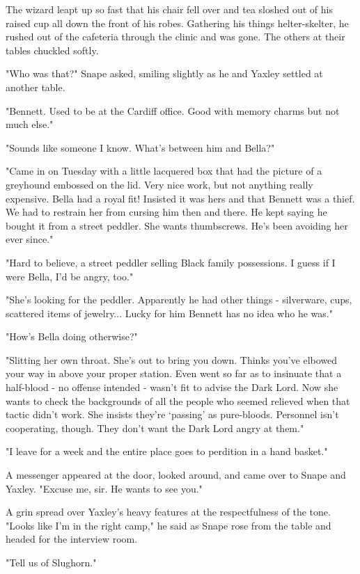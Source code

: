 \documentclass[a4paper,11pt]{article}
\begin{document}
The wizard leapt up so fast that his chair fell over and tea sloshed out of his raised cup all down the front of his robes. Gathering his things helter-skelter, he rushed out of the cafeteria through the clinic and was gone. The others at their tables chuckled softly.

"Who was that?" Snape asked, smiling slightly as he and Yaxley settled at another table.

"Bennett. Used to be at the Cardiff office. Good with memory charms but not much else."

"Sounds like someone I know. What's between him and Bella?"

"Came in on Tuesday with a little lacquered box that had the picture of a greyhound embossed on the lid. Very nice work, but not anything really expensive. Bella had a royal fit! Insisted it was hers and that Bennett was a thief. We had to restrain her from cursing him then and there. He kept saying he bought it from a street peddler. She wants thumbscrews. He's been avoiding her ever since."

"Hard to believe, a street peddler selling Black family possessions. I guess if I were Bella, I'd be angry, too."

"She's looking for the peddler. Apparently he had other things - silverware, cups, scattered items of jewelry... Lucky for him Bennett has no idea who he was."

"How's Bella doing otherwise?"

"Slitting her own throat. She's out to bring you down. Thinks you've elbowed your way in above your proper station. Even went so far as to insinuate that a half-blood - no offense intended - wasn't fit to advise the Dark Lord. Now she wants to check the backgrounds of all the people who seemed relieved when that tactic didn't work. She insists they're `passing' as pure-bloods. Personnel isn't cooperating, though. They don't want the Dark Lord angry at them."

"I leave for a week and the entire place goes to perdition in a hand basket."

A messenger appeared at the door, looked around, and came over to Snape and Yaxley. "Excuse me, sir. He wants to see you."

A grin spread over Yaxley's heavy features at the respectfulness of the tone. "Looks like I'm in the right camp," he said as Snape rose from the table and headed for the interview room.

"Tell us of Slughorn."
\end{document}
